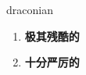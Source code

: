 
\begin{frame}
{\huge draconian}
\begin{center}
\begin{enumerate}\Large
  \item \textbf{极其残酷的}
  \item \textbf{十分严厉的}
\end{enumerate}
\end{center}
\end{frame}
